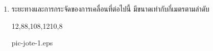 \begin{enumerate}
\item   \begin{ljrp} 
            ระยะทางและการกระจัดของการเคลื่อนที่ต่อไปนี้ มีขนาดเท่ากับกี่เมตรตามลําดับ \runningj
            \begin{4c}
                {12,8}{8,10}{8,12}{10,8}
            \end{4c}
        \end{ljrp}
        \begin{rp}{pic-jote-1.eps}\end{rp}
\end{enumerate}
